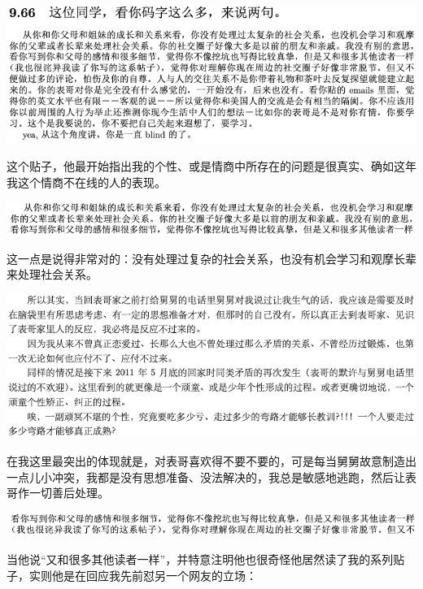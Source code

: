 \documentclass[9pt, b5paper]{article}
\begin{document}
\begin{center}
\includegraphics[width=.9\linewidth]{./pic/backups_plans_20210417_214131.png}
\end{center}

这个贴子，他最开始指出我的个性、或是情商中所存在的问题是很真实、确如这年我这个情商不在线的人的表现。 

\begin{center}
\includegraphics[width=.9\linewidth]{./pic/backups_plans_20210417_214319.png}
\end{center}

这一点是说得非常对的：没有处理过复杂的社会关系，也没有机会学习和观摩长辈来处理社会关系。

\begin{center}
\includegraphics[width=.9\linewidth]{./pic/backups_plans_20210417_225951.png}
\end{center}

在我这里最突出的体现就是，对表哥喜欢得不要不要的，可是每当舅舅故意制造出一点儿小冲突，我都是没有思想准备、没法解决的，我总是敏感地逃跑，然后让表哥作一切善后处理。

\begin{center}
\includegraphics[width=.9\linewidth]{./pic/backups_plans_20210417_231650.png}
\end{center}

当他说“又和很多其他读者一样”，并特意注明他也很奇怪他居然读了我的系列贴子，实则他是在回应我先前怼另一个网友的立场：
\end{document}
